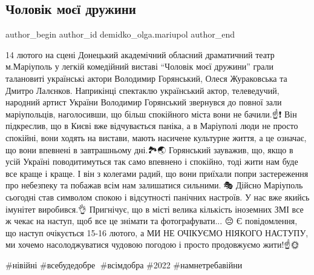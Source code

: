  
 
 
 
 

\subsection{Чоловік моєї дружини}
\label{sec:15_02_2022.fb.demidko_olga.mariupol.1.cholovik_mojej_druzhyny}

\ifcmt
 author_begin
   author_id demidko_olga.mariupol
 author_end
\fi

14 лютого на сцені Донецький академічний обласний драматичний театр
м.Маріуполь у легкій комедійний виставі \enquote{Чоловік моєї дружини} грали талановиті
українські актори Володимир Горянський, Олеся Жураковська та Дмитро Лалєнков.
Наприкінці спектаклю український актор, телеведучий, народний артист України
Володимир Горянський звернувся до повної зали маріупольців, наголосивши, що
більш спокійного міста вони не бачили.☝❗ Він підкреслив, що в Києві вже
відчувається паніка, а в Маріуполі люди не просто спокійні, вони ходять на
вистави, мають насичене культурне життя, а це означає, що вони впевнені в
завтрашньому дні.🏞🌏 Горянський зауважив, що, якщо в усій Україні
поводитимуться так само впевнено і спокійно, тоді жити нам буде все краще і
краще.  І він з колегами радий, що вони приїхали попри застереження про
небезпеку та побажав всім нам залишатися сильними.👏🎭 Дійсно Маріуполь
сьогодні став символом спокою і відсутності панічних  настроїв. У нас вже
якийсь імунітет виробився.👌 Пригнічує, що в місті велика кількість іноземних
ЗМІ все ж чекає на наступ, щоб все це знімати та фотографувати... 😔 Є
повідомлення, що наступ очікується 15-16 лютого, а МИ НЕ  ОЧІКУЄМО НІЯКОГО
НАСТУПУ,  ми хочемо насолоджуватися  чудовою погодою і просто продовжуємо
жити!☝🌞💪

\#нівійні \#всебудедобре🙏 \#всімдобра \#2022 \#намнетребавійни
